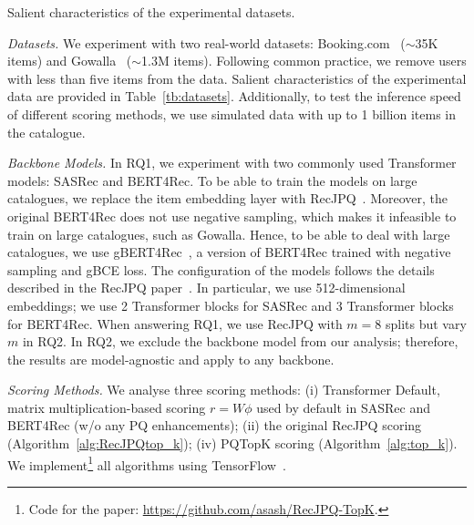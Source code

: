\documentclass[sigconf,natbib=true, review=False]{acmart} %
\newcommand{\pageenlarge}[1]{\marginnote{#1}\enlargethispage{#1\baselineskip}}
\newcommand{\rsasha}[1]{\textcolor[HTML]{000000}{#1}}
\newcommand{\scr}[1]{\textcolor[HTML]{000000}{#1}}
\newcommand{\scrc}[1]{\textcolor[HTML]{000000}{#1}}
\begin{document}
\begin{table}[t]
\caption{Salient characteristics of the experimental datasets.} \label{tb:datasets}
    \resizebox{\linewidth}{!}{
      
}
\end{table}




\textit{Datasets.} We experiment with two real-world datasets: Booking.com~\cite{goldenberg_bookingcom_2021}  ($\sim$35K items) and Gowalla~\cite{choFriendshipMobilityUser2011} ($\sim$1.3M items). Following common practice, we remove users with less than five items from the data. Salient characteristics of the experimental data are provided in Table~\ref{tb:datasets}. Additionally, to test the inference speed of different scoring methods, we use simulated data with up to 1 billion items in the catalogue. 



 \textit{Backbone Models.} \scr{In RQ1, } we experiment with two commonly used Transformer models: SASRec and BERT4Rec. To be able to train the models on large catalogues, we replace the item embedding layer with RecJPQ~\cite{petrovRecJPQTrainingLargeCatalogue2024}. Moreover, the original BERT4Rec does not use negative sampling, which makes it infeasible to train on large catalogues, such as Gowalla. Hence, to be able to deal with large catalogues, we use gBERT4Rec~\cite{petrovGSASRecReducingOverconfidence2023}, a version of BERT4Rec trained with negative sampling and gBCE loss. The configuration of the models follows the details described in the RecJPQ paper~\cite{petrovRecJPQTrainingLargeCatalogue2024}. In particular, we use 512-dimensional embeddings;  we use 2 Transformer blocks for SASRec and 3 Transformer blocks for BERT4Rec. When answering RQ1, we use RecJPQ with $m=8$ splits but vary $m$ in RQ2. \scr{\scrc{In RQ2, we exclude the backbone model from our analysis;} therefore, \scrc{the results are model-agnostic and apply to any backbone}.}

 \textit{Scoring Methods.} We analyse three scoring methods: (i) Transformer Default,  matrix multiplication-based scoring $r = W\phi$ %
used by default in SASRec and BERT4Rec \rsasha{(w/o any PQ enhancements)}; (ii) the original RecJPQ \scrc{scoring} \scrc{(Algorithm~\ref{alg:RecJPQtop_k})}; (iv) PQTopK scoring (\scr{Algorithm~\ref{alg:top_k}}). We implement\footnote{\scrc{Code for the paper: \href{https://github.com/asash/RecJPQ-TopK}{https://github.com/asash/RecJPQ-TopK}}.} all algorithms using TensorFlow~\cite{abadiTensorFlowSystemLargeScale2016}. 
\end{document}
